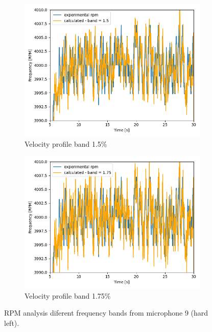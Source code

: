 \documentclass[10pt,fleqn,a4paper,twoside]{article}
\begin{document}
\begin{figure}[H]
        \centering
        \hfill
        \begin{subfigure}{0.4\textwidth}
            \includegraphics[width=\textwidth]{Figures/rpm_analysis_mic8_band_1.5.png}
            \caption{Velocity profile band 1.5\%}
            \label{fig:sixth}
        \end{subfigure}
        \centering
        \hfill
        \begin{subfigure}{0.4\textwidth}
            \includegraphics[width=\textwidth]{Figures/rpm_analysis_mic8_band_1.75.png}
            \caption{Velocity profile band 1.75\%}
            \label{fig:seventh}
        \end{subfigure}
        \caption{RPM analysis diferent frequency bands from microphone 9 (hard left).}
        \label{fig:figures}
        \end{figure}
\end{document}
